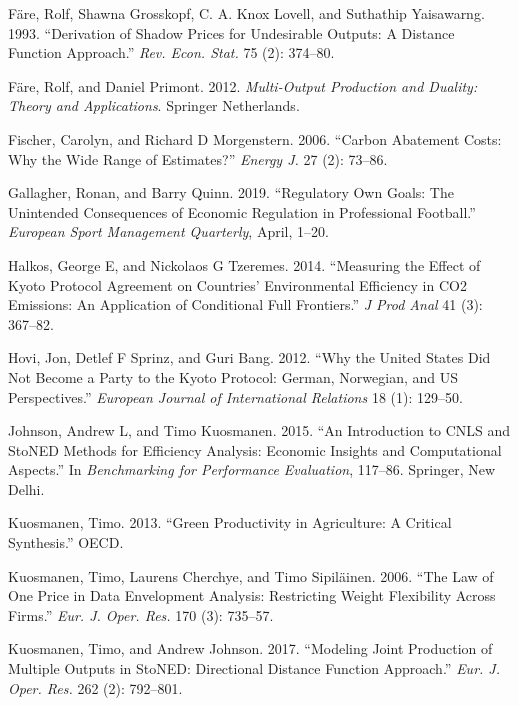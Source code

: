 \documentclass[
  12pt,
]{article}
\begin{document}
\leavevmode\hypertarget{ref-Fare1993}{}%
Färe, Rolf, Shawna Grosskopf, C. A. Knox Lovell, and Suthathip Yaisawarng. 1993. ``Derivation of Shadow Prices for Undesirable Outputs: A Distance Function Approach.'' \emph{Rev. Econ. Stat.} 75 (2): 374--80.

\leavevmode\hypertarget{ref-Fare2012}{}%
Färe, Rolf, and Daniel Primont. 2012. \emph{Multi-Output Production and Duality: Theory and Applications}. Springer Netherlands.

\leavevmode\hypertarget{ref-Fischer2006}{}%
Fischer, Carolyn, and Richard D Morgenstern. 2006. ``Carbon Abatement Costs: Why the Wide Range of Estimates?'' \emph{Energy J.} 27 (2): 73--86.

\leavevmode\hypertarget{ref-Gallagher2019}{}%
Gallagher, Ronan, and Barry Quinn. 2019. ``Regulatory Own Goals: The Unintended Consequences of Economic Regulation in Professional Football.'' \emph{European Sport Management Quarterly}, April, 1--20.

\leavevmode\hypertarget{ref-Halkos2014}{}%
Halkos, George E, and Nickolaos G Tzeremes. 2014. ``Measuring the Effect of Kyoto Protocol Agreement on Countries' Environmental Efficiency in CO2 Emissions: An Application of Conditional Full Frontiers.'' \emph{J Prod Anal} 41 (3): 367--82.

\leavevmode\hypertarget{ref-Hovi2012}{}%
Hovi, Jon, Detlef F Sprinz, and Guri Bang. 2012. ``Why the United States Did Not Become a Party to the Kyoto Protocol: German, Norwegian, and US Perspectives.'' \emph{European Journal of International Relations} 18 (1): 129--50.

\leavevmode\hypertarget{ref-Johnson2015}{}%
Johnson, Andrew L, and Timo Kuosmanen. 2015. ``An Introduction to CNLS and StoNED Methods for Efficiency Analysis: Economic Insights and Computational Aspects.'' In \emph{Benchmarking for Performance Evaluation}, 117--86. Springer, New Delhi.

\leavevmode\hypertarget{ref-Kuosmanen2013}{}%
Kuosmanen, Timo. 2013. ``Green Productivity in Agriculture: A Critical Synthesis.'' OECD.

\leavevmode\hypertarget{ref-Kuosmanen2006}{}%
Kuosmanen, Timo, Laurens Cherchye, and Timo Sipiläinen. 2006. ``The Law of One Price in Data Envelopment Analysis: Restricting Weight Flexibility Across Firms.'' \emph{Eur. J. Oper. Res.} 170 (3): 735--57.

\leavevmode\hypertarget{ref-Kuosmanen2017}{}%
Kuosmanen, Timo, and Andrew Johnson. 2017. ``Modeling Joint Production of Multiple Outputs in StoNED: Directional Distance Function Approach.'' \emph{Eur. J. Oper. Res.} 262 (2): 792--801.
\end{document}
